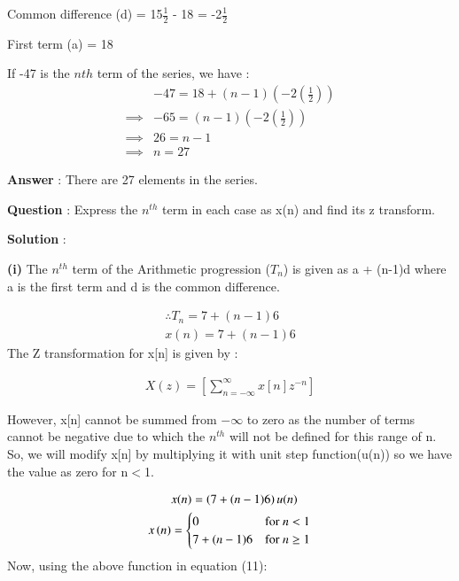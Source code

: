 \documentclass[journal,12pt,twocolumn]{IEEEtran}
\theoremstyle{remark}
\begin{document}
\vspace{4mm}

Common difference (d) = 15\(\frac{1}{2}\) - 18 = -2\(\frac{1}{2}\)

First term (a) = 18

\vspace{4mm}

If -47 is the \(n{th}\) term of the series, we have :
\begin{align}
&-47 = 18 + (n-1)\left(-2\left(\frac{1}{2}\right)\right)\\ 
\implies& -65 = (n-1)\left(-2\left(\frac{1}{2}\right)\right)\\
\implies& 26 = n-1\\
\implies& n = 27
\end{align} 

\large\textbf{Answer} : \normalsize There are 27 elements in the series.

\vspace{10mm}

\large\textbf{Question} : \normalsize Express the $n^{th}$ term in each case as x(n) and find its z transform.

\vspace{4mm}

\large\textbf{Solution} : \normalsize

\vspace{4mm}

\textbf{(i)} The \(n^{th}\) term of the Arithmetic progression ($T_{n}$) is given as a + (n-1)d where a is the first term and d is the common difference.

\begin{align}
\therefore T_{n} = 7 + (n-1)6 \\
x(n) = 7 + (n-1)6
\end{align}
The Z transformation for x[n] is given by :

\begin{align}
    X(z) =\left[ \sum_{n=-\infty}^{\infty}x[n]z^{-n}\right]
\end{align}

However, x[n] cannot be summed from $-\infty$ to zero as the number of terms cannot be negative due to which the $n^{th}$ will not be defined for this range of n.\\
So, we will modify x[n] by multiplying it with unit step function(u(n)) so we have the value as zero for n$<$1.

\begin{align}
&x(n) = \left(7 + (n-1)6\right)u(n) \\
     x\left(n\right) & = \begin{cases}
        0 & \text{for } n < 1 \\
        7 + (n-1)6 & \text{for } n \geq 1
    \end{cases}
\end{align}
Now, using the above function in equation (11):
\end{document}
